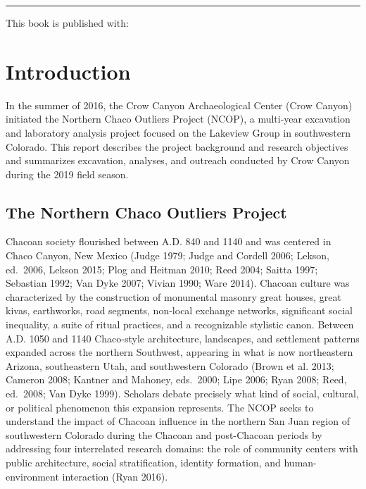 \documentclass[
  12pt,
]{krantz}
\begin{document}
\begin{center}\rule{0.5\linewidth}{0.5pt}\end{center}

This book is published with:

\mainmatter

\hypertarget{introduction}{%
\chapter{Introduction}\label{introduction}}

In the summer of 2016, the Crow Canyon Archaeological Center (Crow
Canyon) initiated the Northern Chaco Outliers Project (NCOP), a
multi-year excavation and laboratory analysis project focused on the
Lakeview Group in southwestern Colorado. This report describes the
project background and research objectives and summarizes excavation,
analyses, and outreach conducted by Crow Canyon during the 2019 field
season.

\hypertarget{the-northern-chaco-outliers-project}{%
\section{The Northern Chaco Outliers Project}\label{the-northern-chaco-outliers-project}}

Chacoan society flourished between A.D. 840 and 1140 and was centered in
Chaco Canyon, New Mexico (Judge 1979; Judge and Cordell 2006; Lekson,
ed.~2006, Lekson 2015; Plog and Heitman 2010; Reed 2004; Saitta 1997;
Sebastian 1992; Van Dyke 2007; Vivian 1990; Ware 2014). Chacoan culture
was characterized by the construction of monumental masonry great
houses, great kivas, earthworks, road segments, non-local exchange
networks, significant social inequality, a suite of ritual practices,
and a recognizable stylistic canon. Between A.D. 1050 and 1140
Chaco-style architecture, landscapes, and settlement patterns expanded
across the northern Southwest, appearing in what is now northeastern
Arizona, southeastern Utah, and southwestern Colorado (Brown et al.
2013; Cameron 2008; Kantner and Mahoney, eds.~2000; Lipe 2006; Ryan
2008; Reed, ed.~2008; Van Dyke 1999). Scholars debate precisely what
kind of social, cultural, or political phenomenon this expansion
represents. The NCOP seeks to understand the impact of Chacoan influence
in the northern San Juan region of southwestern Colorado during the
Chacoan and post-Chacoan periods by addressing four interrelated
research domains: the role of community centers with public
architecture, social stratification, identity formation, and
human-environment interaction (Ryan 2016).
\end{document}
